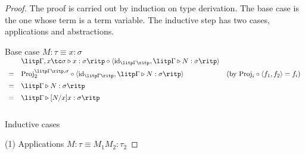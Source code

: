\begin{proof}\mbox\\

The proof is carried out by induction on type derivation. The base case is the one whose term is a term variable. The inductive step has two cases, applications and abstractions.

Base case $ M: \tau \equiv x: \sigma $ \\[5pt]
$
\begin{array}{rll}
   & \litp \Gamma , x \tc \sigma \triangleright x: \sigma \ritp \circ \langle \text{id}_{\litp \Gamma \ritp} , \litp \Gamma \triangleright N: \sigma \ritp \rangle & \\[5pt]
 = & \text{Proj}_2^{\litp \Gamma \ritp , \sigma} \circ \langle \text{id}_{\litp \Gamma \ritp} , \litp \Gamma \triangleright N: \sigma \ritp \rangle & (\text{by } \text{Proj}_i \circ \langle f_1, f_2 \rangle = f_i ) \\[5pt]
 = & \litp \Gamma \triangleright N: \sigma \ritp & \\[5pt]
 = & \litp \Gamma \triangleright [N/x]x: \sigma \ritp & \\[10pt]
\end{array}
$

Inductive cases

(1) Applications $ M: \tau \equiv M_1 M_2 : \tau_2 $


\end{proof}
